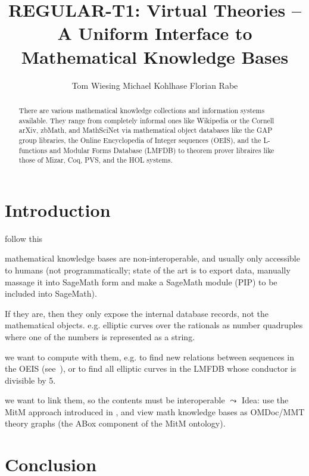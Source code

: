 \documentclass{llncs}
\title{REGULAR-T1: Virtual Theories -- A Uniform Interface to Mathematical Knowledge Bases}
\author{
Tom Wiesing\inst{1}
Michael Kohlhase\inst{1} 
Florian Rabe\inst{2} 
}
\institute{
   FAU Erlangen-N\"urnberg
   \and Jacobs University Bremen
}
\begin{document}
\maketitle
\begin{abstract}
  There are various mathematical knowledge collections and information systems
  available. They range from completely informal ones like Wikipedia or the Cornell arXiv,
  zbMath, and MathSciNet via mathematical object databases like the GAP group libraries,
  the Online Encyclopedia of Integer sequences (OEIS), and the L-functions and Modular
  Forms Database (LMFDB) to theorem prover libraires like those of Mizar, Coq, PVS, and
  the HOL systems.
\end{abstract}

\section{Introduction}\label{sec:intro}
\begin{todolist}{follow this}
\item mathematical knowledge bases are non-interoperable, and usually only accessible to
  humans (not programmatically; state of the art is to export data, manually massage it
  into SageMath form and make a SageMath module (PIP) to be included into SageMath). 
\item If they are, then they only expose the internal database records, not the
  mathematical objects. e.g. elliptic curves over the rationals as number quadruples where
  one of the numbers is represented as a string.
\item we want to compute with them, e.g. to find new relations between sequences in the
  OEIS (see~\cite{LuzKoh:fsarfo16}), or to find all elliptic curves in the LMFDB whose
  conductor is divisible by 5. 
\item we want to link them, so the contents must be interoperable $\leadsto$ Idea: use
  the MitM approach introduced in \cite{DehKohKon:iop16}, and view math knowledge bases as
  OMDoc/MMT theory graphs (the ABox component of the MitM ontology).
\item 
\end{todolist}
\section{Conclusion}\label{sec:concl}
\printbibliography
\end{document}
